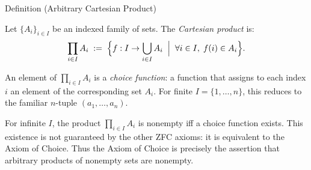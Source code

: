 \begin{definitionbox}{Definition (Arbitrary Cartesian Product)}
\begin{definition}\label{def:arbitrary-product}
Let $\{A_i\}_{i \in I}$ be an indexed family of sets. The \emph{Cartesian
product} is:
\[
\prod_{i \in I} A_i
\;:=\;
\Bigl\{
f : I \to \bigcup_{i \in I} A_i
\;\Bigm|\;
\forall i \in I,\; f(i) \in A_i
\Bigr\}.
\]
\end{definition}
\end{definitionbox}

\begin{remark*}
An element of $\prod_{i \in I} A_i$ is a \emph{choice function}: a function
that assigns to each index $i$ an element of the corresponding set $A_i$.
For finite $I = \{1,\dots,n\}$, this reduces to the familiar $n$-tuple
$(a_1,\dots,a_n)$.
\end{remark*}

\begin{remark*}
For infinite $I$, the product $\prod_{i \in I} A_i$ is nonempty iff a choice
function exists. This existence is not guaranteed by the other ZFC axioms:
it is equivalent to the Axiom of Choice. Thus the Axiom of Choice is
precisely the assertion that arbitrary products of nonempty sets are nonempty.
\end{remark*}
